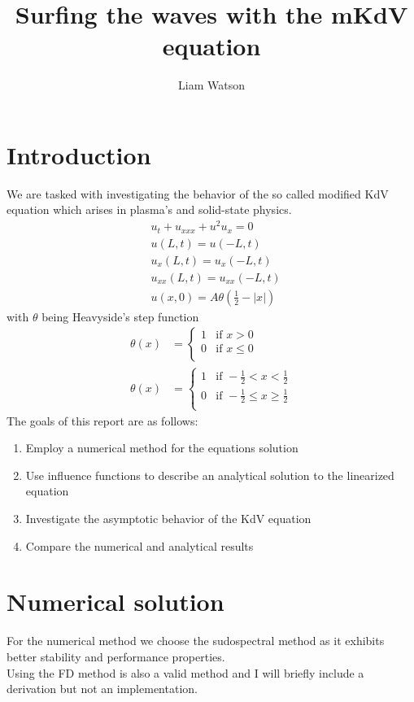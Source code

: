 \documentclass{article}
\title{Surfing the waves with the mKdV equation}
\author{Liam Watson}
\begin{document}
\maketitle

\section{Introduction}
We are tasked with investigating the behavior of the so called modified KdV equation which arises in plasma's and solid-state physics.
\begin{align}
&u_t + u_{xxx} + u^2u_x = 0 \\
&u(L,t) = u(-L,t) \\
&u_x(L,t) = u_x(-L,t) \\
&u_{xx}(L,t) = u_{xx}(-L,t) \\
&u(x,0) = A \theta(\frac{1}{2}- |x|) 
\end{align}
with $\theta$ being Heavyside’s step function
\begin{align*}
\theta(x) &=
\begin{cases}
 1 & \text{if } x > 0 \\
 0 & \text{if } x \leq 0 \\
\end{cases}
\\
\theta(x) &=
\begin{cases}
 1 & \text{if } -\frac{1}{2} < x < \frac{1}{2} \\
 0 & \text{if } -\frac{1}{2} \leq x \geq \frac{1}{2}\\
\end{cases}
\end{align*}
The goals of this report are as follows:
\begin{enumerate}
\item Employ a numerical method for the equations solution 
\item Use influence functions to describe an analytical solution to the linearized equation
\item Investigate the asymptotic behavior of the KdV equation 
\item Compare the numerical and analytical results
\end{enumerate}
\section{Numerical solution}
For the numerical method we choose the sudospectral method as it exhibits better stability and performance properties. \\
Using the FD method is also a valid method and I will briefly include a derivation but not an implementation. \\
\end{document}
